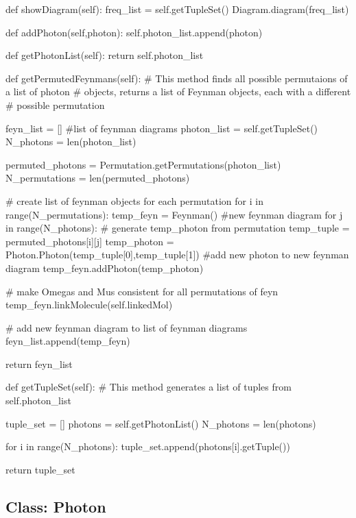 \documentclass[11pt,a4paper,notitlepage]{article}
\begin{document}
\begin{code}
    def showDiagram(self):
        freq_list = self.getTupleSet()
        Diagram.diagram(freq_list)
    
    def addPhoton(self,photon):
        self.photon_list.append(photon)

    def getPhotonList(self):
        return self.photon_list

    def getPermutedFeynmans(self):
        # This method finds all possible permutaions of a list of photon
        # objects, returns a list of Feynman objects, each with a different
        # possible permutation
        
        feyn_list = []  #list of feynman diagrams
        photon_list = self.getTupleSet()
        N_photons = len(photon_list)

        permuted_photons = Permutation.getPermutations(photon_list)
        N_permutations = len(permuted_photons)

        # create list of feynman objects for each permutation
        for i in range(N_permutations):
            temp_feyn = Feynman()   #new feynman diagram
            for j in range(N_photons):
                # generate temp_photon from permutation
                temp_tuple = permuted_photons[i][j]
                temp_photon = Photon.Photon(temp_tuple[0],temp_tuple[1])
                #add new photon to new feynman diagram
                temp_feyn.addPhoton(temp_photon)
            
            # make Omegas and Mus consistent for all permutations of feyn
            temp_feyn.linkMolecule(self.linkedMol)
            
            # add new feynman diagram to list of feynman diagrams
            feyn_list.append(temp_feyn)

        return feyn_list

    def getTupleSet(self):
        # This method generates a list of tuples from self.photon_list
        
        tuple_set = []
        photons = self.getPhotonList()
        N_photons = len(photons)
        
        for i in range(N_photons):
            tuple_set.append(photons[i].getTuple())
        
        return tuple_set

\end{code}

\subsection{Class: Photon}
\end{document}
